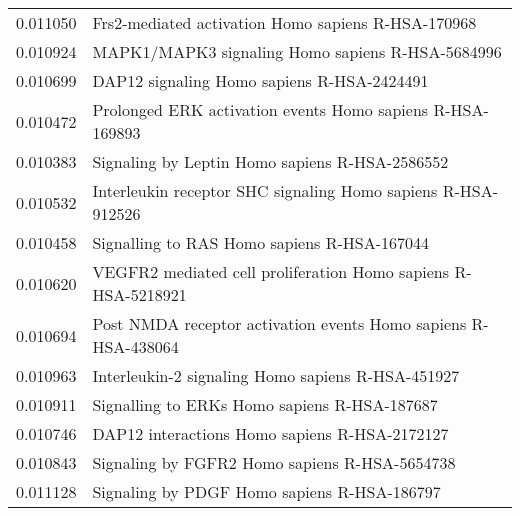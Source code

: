 \begin{longtable}{p{2.4cm}p{14.5cm}}
                 0.011050 &                                                                 Frs2-mediated activation Homo sapiens R-HSA-170968 \\
                 0.010924 &                                                                   MAPK1/MAPK3 signaling Homo sapiens R-HSA-5684996 \\
                 0.010699 &                                                                         DAP12 signaling Homo sapiens R-HSA-2424491 \\
                 0.010472 &                                                          Prolonged ERK activation events Homo sapiens R-HSA-169893 \\
                 0.010383 &                                                                     Signaling by Leptin Homo sapiens R-HSA-2586552 \\
                 0.010532 &                                                       Interleukin receptor SHC signaling Homo sapiens R-HSA-912526 \\
                 0.010458 &                                                                        Signalling to RAS Homo sapiens R-HSA-167044 \\
                 0.010620 &                                                      VEGFR2 mediated cell proliferation Homo sapiens R-HSA-5218921 \\
                 0.010694 &                                                     Post NMDA receptor activation events Homo sapiens R-HSA-438064 \\
                 0.010963 &                                                                  Interleukin-2 signaling Homo sapiens R-HSA-451927 \\
                 0.010911 &                                                                       Signalling to ERKs Homo sapiens R-HSA-187687 \\
                 0.010746 &                                                                      DAP12 interactions Homo sapiens R-HSA-2172127 \\
                 0.010843 &                                                                      Signaling by FGFR2 Homo sapiens R-HSA-5654738 \\
                 0.011128 &                                                                        Signaling by PDGF Homo sapiens R-HSA-186797 \\

\end{longtable}
